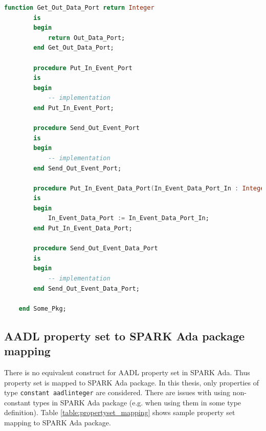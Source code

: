 \begin{lstlisting}[language=ada, frame=single, gobble=0, caption={Translation of sample AADL package from listing \ref{lst:aadl_sample}}]
	    function Get_Out_Data_Port return Integer
	    is
	    begin
	        return Out_Data_Port;
	    end Get_Out_Data_Port;

	    procedure Put_In_Event_Port
	    is
	    begin
	        -- implementation
	    end Put_In_Event_Port;

	    procedure Send_Out_Event_Port
	    is
	    begin
	        -- implementation
	    end Send_Out_Event_Port;

	    procedure Put_In_Event_Data_Port(In_Event_Data_Port_In : Integer)
	    is
	    begin
	        In_Event_Data_Port := In_Event_Data_Port_In;
	    end Put_In_Event_Data_Port;

	    procedure Send_Out_Event_Data_Port
	    is
	    begin
	        -- implementation
	    end Send_Out_Event_Data_Port;

	end Some_Pkg;
\end{lstlisting}
\label{lst:package_mapping}
\doublespacing



\subsection{AADL property set to SPARK Ada package mapping}
\label{codegen:mapping:propertyset}

There is no equivalent construct for AADL property set in SPARK Ada. Thus property set is mapped to SPARK Ada package. In this thesis, only properties of type \lstinline{constant aadlinteger} are considered. There are issues with using non-constant types in SPARK Ada package (e.g. when using them in some type definition). Table \ref{table:propertyset_mapping} shows sample property set mapping to SPARK Ada package.

